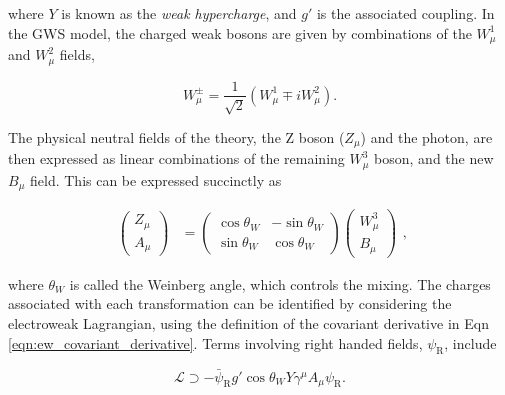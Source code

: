 \noindent where $Y$ is known as the \textit{weak hypercharge}, and $g'$ is the associated coupling. In the GWS model, the charged weak bosons are given by combinations of the $W^{1}_{\mu}$ and $W^{2}_{\mu}$ fields,

\begin{equation}
     W^{\pm}_\mu = \frac{1}{\sqrt{2}}(W_\mu^1 \mp iW_\mu^2).
\end{equation}

\noindent The physical neutral fields of the theory, the $\mathrm{Z}$ boson ($Z_{\mu}$) and the photon, are then expressed as linear combinations of the remaining $W^{3}_{\mu}$ boson, and the new $B_\mu$ field. This can be expressed succinctly as

\begin{equation}
\label{eqn:Z_photon_rotation_matrix}
\begin{split}
    \begin{pmatrix}
    Z_\mu \\
    A_\mu
    \end{pmatrix} 
    &= 
    \begin{pmatrix}
    \cos{\theta_W} & -\sin{\theta_W} \\
    \sin{\theta_W} & \cos{\theta_W}
    \end{pmatrix} 
    \begin{pmatrix}
    W^3_\mu \\
    B_\mu
    \end{pmatrix}
\end{split}
,
\end{equation}

\noindent where $\theta_{W}$ is called the Weinberg angle, which controls the mixing. The charges associated with each transformation can be identified by considering the electroweak Lagrangian, using the definition of the covariant derivative in Eqn \ref{eqn:ew_covariant_derivative}. Terms involving right handed fields, $\psi_{\mathrm{R}}$, include

\begin{equation}
    \mathcal{L} \supset -\bar{\psi}_{\mathrm{R}}g'\cos{\theta_{W}}Y\gamma^{\mu}A_{\mu}\psi_{\mathrm{R}}.
\end{equation}


